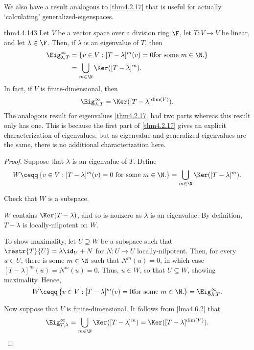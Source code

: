 We also have a result analogous to \cref{thm4.2.17} that is useful for actually `calculating' generalized-eigenspaces.
\begin{thm}{}{thm4.4.143}
	Let $V$ be a vector space over a division ring $\F$, let $T\colon V\rightarrow V$ be linear, and let $\lambda \in \F$.  Then, if $\lambda$ is an eigenvalue of $T$, then
	\begin{equation}
		\begin{split}
			\Eig _{\lambda ,T}^{\infty} & =\left\{ v\in V:[T-\lambda ]^m(v)=0\text{for some }m\in \N \text{.}\right\} \\
			& =\bigcup _{m\in \N}\Ker ([T-\lambda ]^m).
		\end{split}
	\end{equation}
	In fact, if $V$ is finite-dimensional, then
	\begin{equation}
		\Eig _{\lambda ,T}^{\infty}=\Ker ([T-\lambda ]^{\dim (V)}).
	\end{equation}
	The analogous result for eigenvalues \cref{thm4.2.17} had two parts whereas this result only has one.  This is because the first part of \cref{thm4.2.17} gives an explicit characterization of eigenvalues, but as eigenvalue and generalized-eigenvalues are the same, there is no additional characterization here.
	\begin{proof}
		Suppose that $\lambda$ is an eigenvalue of $T$.  Define
		\begin{equation}
			W\ceqq \left\{ v\in V:[T-\lambda ]^m(v)=0\text{ for some }m\in \N \text{.}\right\} =\bigcup _{m\in \N}\Ker ([T-\lambda ]^m).
		\end{equation}
		\begin{exr}[breakable=false]{}{}
			Check that $W$ is a subspace.
		\end{exr}
		$W$ contains $\Ker (T-\lambda )$, and so is nonzero as $\lambda$ is an eigenvalue.  By definition, $T-\lambda$ is locally-nilpotent on $W$.
		
		To show maximality, let $U\supseteq W$ be a subspace such that $\restr{T}{U}=\lambda \id _U+N$ for $N\colon U\rightarrow U$ locally-nilpotent.  Then, for every $u\in U$, there is some $m\in \N$ such that $N^m(u)=0$, in which case $[T-\lambda ]^m(u)=N^m(u)=0$.  Thus, $u\in W$, so that $U\subseteq W$, showing maximality.  Hence,
		\begin{equation}
		W\ceqq \left\{ v\in V:[T-\lambda ]^m(v)=0\text{for some }m\in \N \text{.}\right\} =\Eig _{\lambda ,T}^{\infty}.
		\end{equation}
		
		Now suppose that $V$ is finite-dimensional.  It follows from \cref{lma4.6.2} that
		\begin{equation}
			\Eig _{T,\lambda}^{\infty}=\bigcup _{m\in \N}\Ker ([T-\lambda ]^m)=\Ker ([T-\lambda ]^{\dim (V)}).
		\end{equation}
	\end{proof}
\end{thm}
